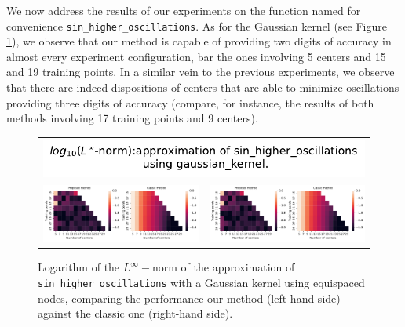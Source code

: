 \documentclass[12pt]{report} %
\begin{document}
We now address the results of our experiments on the function named for convenience \texttt{sin\_higher\_oscillations}. As for the Gaussian kernel (see Figure \ref{fig:sin-higher-oscillations-gaussian-kernel-comparison-methods}), we observe that our method is capable of providing two digits of accuracy in almost every experiment configuration, bar the ones involving 5 centers and 15 and 19 training points. In a similar vein to the previous experiments, we observe that there are indeed dispositions of centers that are able to minimize oscillations providing three digits of accuracy (compare, for instance, the results of both methods involving 17 training points and 9 centers).

\begin{figure}[h]
  \begin{tabular}{cc}
    \multicolumn{2}{c}{{\includegraphics[width=.5\textwidth]
    {imagenes/experiments/1d/variational/linf_sin_higher_oscillations_gaussian_kernel_Methods_Title.pdf}}}                                                                                       \\
    {\includegraphics[height=.4\textwidth, trim={0 0 11.5cm 0},clip=true]
    {imagenes/experiments/1d/variational/linf_sin_higher_oscillations_gaussian_kernel_Methods_Comparison.pdf}}  &
     {\includegraphics[height=.4\textwidth, trim={9.5cm 0 0 0},clip=true]{imagenes/experiments/1d/variational/linf_sin_higher_oscillations_gaussian_kernel_Methods_Comparison.pdf}} \\
  \end{tabular}
  \caption{Logarithm of the $L^\infty-$norm of the approximation of \texttt{sin\_higher\_oscillations} with a Gaussian kernel using equispaced nodes, comparing the performance our method (left-hand side) against the classic one (right-hand side).}
  \label{fig:sin-higher-oscillations-gaussian-kernel-comparison-methods}
\end{figure}
\end{document}
